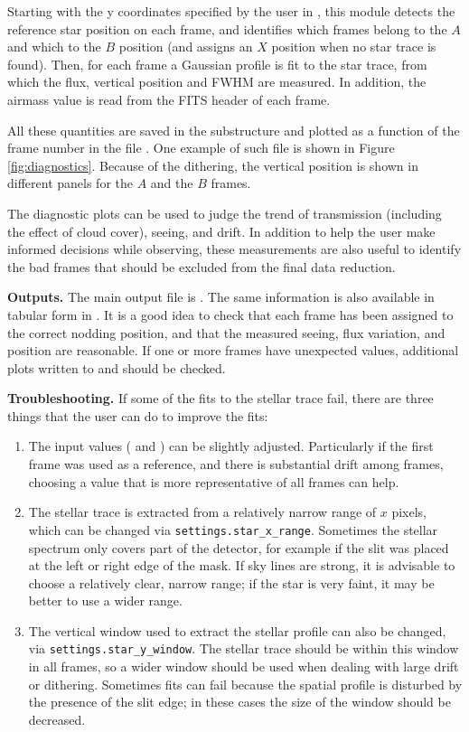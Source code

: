 \documentclass[a4paper]{article}
\begin{document}
\begin{sloppypar}
Starting with the y coordinates specified by the user in , this module detects the reference star position on each frame, and identifies which frames belong to the $A$ and which to the $B$ position (and assigns an $X$ position when no star trace is found). Then, for each frame a Gaussian profile is fit to the star trace, from which the flux, vertical position and FWHM are measured. In addition, the airmass value is read from the FITS header of each frame.

All these quantities are saved in the substructure  and plotted as a function of the frame number in the file . One example of such file is shown in Figure \ref{fig:diagnostics}. Because of the dithering, the vertical position is shown in different panels for the $A$ and the $B$ frames.

The diagnostic plots can be used to judge the trend of transmission (including the effect of cloud cover), seeing, and drift. In addition to help the user make informed decisions while observing, these measurements are also useful to identify the bad frames that should be excluded from the final data reduction.

\medskip
\noindent
\textbf{Outputs.} The main output file is . The same information is also available in tabular form in . It is a good idea to check that each frame has been assigned to the correct nodding position, and that the measured seeing, flux variation, and position are reasonable. If one or more frames have unexpected values, additional plots written to  and  should be checked.

\medskip
\noindent
\textbf{Troubleshooting.} If some of the fits to the stellar trace fail, there are three things that the user can do to improve the fits:
\begin{enumerate}
\item The input values ( and ) can be slightly adjusted. Particularly if the first frame was used as a reference, and there is substantial drift among frames, choosing a value that is more representative of all frames can help.
\item The stellar trace is extracted from a relatively narrow range of $x$ pixels, which can be changed via \texttt{settings.star\_x\_range}. Sometimes the stellar spectrum only covers part of the detector, for example if the slit was placed at the left or right edge of the mask. If sky lines are strong, it is advisable to choose a relatively clear, narrow range; if the star is very faint, it may be better to use a wider range.
\item The vertical window used to extract the stellar profile can also be changed, via \texttt{settings.star\_y\_window}. The stellar trace should be within this window in all frames, so a wider window should be used when dealing with large drift or dithering. Sometimes fits can fail because the spatial profile is disturbed by the presence of the slit edge; in these cases the size of the window should be decreased.
\end{enumerate}



\end{sloppypar}
\end{document}
